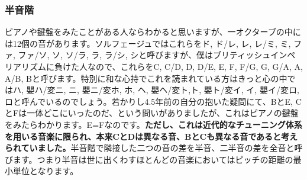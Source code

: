 \documentclass[11pt]{ltjarticle}
\begin{document}
\subsubsection{半音階}
ピアノや鍵盤をみたことがある人ならわかると思いますが、一オクターブの中には12個の音があります。ソルフェージュではこれらをド, ド\sh /レ\fl , レ, レ\sh /ミ\fl , ミ, ファ, ファ\sh /ソ\fl , ソ, ソ\sh /ラ\fl, ラ, ラ\sh /シ\fl , シと呼びますが、僕はブリティッシュインペリアリズムに負けた人なので、これらをC, C\sh /D\fl , D, D\sh /E\fl , E, F, F\sh /G\fl, G, G\sh /A\fl , A, A\sh /B\fl , Bと呼びます。特別に和な心持でこれを読まれている方はきっと心の中ではハ, 嬰ハ/変ニ, ニ, 嬰ニ/変ホ, ホ, ヘ, 嬰ヘ/変ト,ト, 嬰ト/変イ, イ, 嬰イ/変ロ, ロと呼んでいるのでしょう。若かりし4.5年前の自分の抱いた疑問にて、B\sh とE\sh , C\fl とF\fl は一体どこにいったのだ、という問いがありましたが、これはピアノの鍵盤をみたらわかります。E\sh =Fなのです。\textbf{ただし、これは近代的なチューニング体系を用いる音楽に限られ、本来C\sh とD\fl は異なる音、B\sh とCも異なる音であると考えられていました。}半音階で隣接した二つの音の差を半音、二半音の差を全音と呼びます。つまり半音は世に出くわすほとんどの音楽においてはピッチの距離の最小単位となります。
\end{document}

